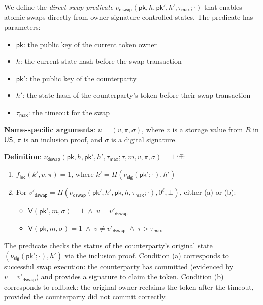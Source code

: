 \documentclass{article}
\newcommand{\sigver}[0]{\mathsf{V}}
\newcommand{\pubkey}[0]{\mathsf{pk}}
\newcommand{\unisrv}[0]{\mathsf{US}}
\begin{document}
We define the \emph{direct swap predicate} $\nu_\mathsf{dswap}(\pubkey,h,\pubkey',h',\tau_\mathsf{max};\cdot)$ that enables atomic swaps directly from owner signature-controlled states. The predicate has parameters:
\begin{itemize}
\item $\pubkey$: the public key of the current token owner
\item $h$: the current state hash before the swap transaction
\item $\pubkey'$: the public key of the counterparty
\item $h'$: the state hash of the counterparty's token before their swap transaction
\item $\tau_\mathsf{max}$: the timeout for the swap
\end{itemize}
\medskip

\noindent\textbf{Name-specific arguments}: $u = (v, \pi, \sigma)$, where $v$ is a storage value from $R$ in $\unisrv$, $\pi$ is an inclusion proof, and $\sigma$ is a digital signature.\medskip

\noindent\textbf{Definition}: $\nu_\mathsf{dswap}(\pubkey,h,\pubkey',h',\tau_\mathsf{max};\tau,m,v,\pi,\sigma) = 1$ iff:
\begin{enumerate}
\item $f_\mathsf{inc}(k', v, \pi) = 1$, where $k' = H(\nu_\mathsf{sig}(\pubkey';\cdot), h')$
\item For $v'_\mathsf{dswap} = H(\nu_\mathsf{dswap}(\pubkey',h',\pubkey,h,\tau_\mathsf{max};\cdot), 0^\ell, \bot)$, either (a) or (b):
\begin{itemize}
\item[(a)] $\sigver(\pubkey', m, \sigma) = 1 \;\wedge\; v = v'_\mathsf{dswap}$
\item[(b)] $\sigver(\pubkey, m, \sigma) = 1 \;\wedge\; v \neq v'_\mathsf{dswap} \;\wedge\; \tau > \tau_\mathsf{max}$
\end{itemize}
\end{enumerate}
\medskip

\noindent The predicate checks the status of the counterparty's original state $(\nu_\mathsf{sig}(\pubkey';\cdot), h')$ via the inclusion proof. Condition (a) corresponds to successful swap execution: the counterparty has committed (evidenced by $v = v'_\mathsf{dswap}$) and provides a signature to claim the token. Condition (b) corresponds to rollback: the original owner reclaims the token after the timeout, provided the counterparty did not commit correctly.
\end{document}
